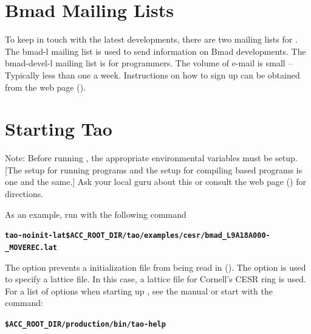\documentclass{hitec}
\newcommand{\BF}[1]{{\normalfont\textbf{#1}}}
\newenvironment{display}
  {\vspace*{-1.5ex} \begin{alltt}}
  {\end{alltt} \vspace*{-1.0ex}}
\begin{document}
\section{Bmad Mailing Lists}

To keep in touch with the latest \bmad developments, there are two mailing lists for
\bmad.  The bmad-l mailing list is used to send information on Bmad developments.  The
bmad-devel-l mailing list is for programmers. The volume of e-mail is small -- Typically
less than one a week. Instructions on how to sign up can be obtained from the \bmad web
page ().

\section{Starting Tao}
\label{s:starting.tao}

Note: Before running \tao, the appropriate environmental variables must be setup.
[The setup for running programs and the setup for compiling \bmad based programs is one
and the same.] Ask your local \bmad guru about this or consult the \bmad web page
() for directions.

As an example, run \tao with the following command
\begin{display}
  \BF{tao -noinit -lat \$ACC_ROOT_DIR/tao/examples/cesr/bmad_L9A18A000-_MOVEREC.lat}
\end{display}
The  option prevents a \tao initialization file from being read in
(). The  option is used to specify a lattice file. In this case,
a lattice file for Cornell's CESR ring is used. For a list of options when starting up
\tao, see the \tao manual or start \tao with the command:
\begin{display}
  \BF{\$ACC_ROOT_DIR/production/bin/tao -help}
\end{display}
\end{document}
